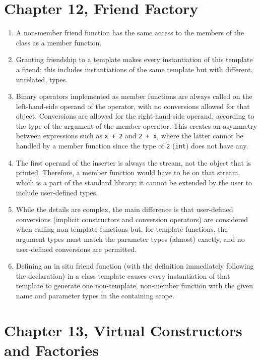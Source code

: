 \section{Chapter 12, Friend Factory}

\begin{enumerate}
\item
  A non-member friend function has the same access to the members of the class as a member function.
\item
  Granting friendship to a template makes every instantiation of this template a friend; this includes instantiations of the same template but with different, unrelated, types.
\item
  Binary operators implemented as member functions are always called on the left-hand-side operand of the operator, with no conversions allowed for that object. Conversions are allowed for the right-hand-side operand, according to the type of the argument of the member operator. This creates an asymmetry between expressions such as \texttt{x\ +\ 2} and \texttt{2\ +\ x}, where the latter cannot be handled by a member function since the type of \texttt{2} (\texttt{int}) does not have any.
\item
  The first operand of the inserter is always the stream, not the object that is printed. Therefore, a member function would have to be on that stream, which is a part of the standard library; it cannot be extended by the user to include user-defined types.
\item
  While the details are complex, the main difference is that user-defined conversions (implicit constructors and conversion operators) are considered when calling non-template functions but, for template functions, the argument types must match the parameter types (almost) exactly, and no user-defined conversions are permitted.
\item
  Defining an in situ friend function (with the definition immediately following the declaration) in a class template causes every instantiation of that template to generate one non-template, non-member function with the given name and parameter types in the containing scope.
\end{enumerate}

\section{Chapter 13, Virtual Constructors and Factories}

